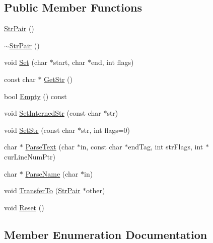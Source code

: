 \subsection*{Public Member Functions}
\begin{DoxyCompactItemize}
\item 
\mbox{\hyperlink{classtinyxml2_1_1_str_pair_a69153963f7052de9f767d3d8c1623a70}{Str\+Pair}} ()
\item 
\mbox{\hyperlink{classtinyxml2_1_1_str_pair_a60bed84d2503296e1c2a73fcef1431f9}{$\sim$\+Str\+Pair}} ()
\item 
void \mbox{\hyperlink{classtinyxml2_1_1_str_pair_a4f05549373394266a1eecba26813c166}{Set}} (char $\ast$start, char $\ast$end, int flags)
\item 
const char $\ast$ \mbox{\hyperlink{classtinyxml2_1_1_str_pair_ad87e3d11330f5e689ba1e7e54c023b57}{Get\+Str}} ()
\item 
bool \mbox{\hyperlink{classtinyxml2_1_1_str_pair_aca963a7eaa900bfddbea7312f040b39c}{Empty}} () const
\item 
void \mbox{\hyperlink{classtinyxml2_1_1_str_pair_a2baf6230e18333e02ab65d0897ee3941}{Set\+Interned\+Str}} (const char $\ast$str)
\item 
void \mbox{\hyperlink{classtinyxml2_1_1_str_pair_a1f82ec6b5bee35ee7466d8565e43b1de}{Set\+Str}} (const char $\ast$str, int flags=0)
\item 
char $\ast$ \mbox{\hyperlink{classtinyxml2_1_1_str_pair_a68e6999b7677fa711287ececb9ba317e}{Parse\+Text}} (char $\ast$in, const char $\ast$end\+Tag, int str\+Flags, int $\ast$cur\+Line\+Num\+Ptr)
\item 
char $\ast$ \mbox{\hyperlink{classtinyxml2_1_1_str_pair_aa6d8998efceba41d87ec2300c70a6085}{Parse\+Name}} (char $\ast$in)
\item 
void \mbox{\hyperlink{classtinyxml2_1_1_str_pair_a35f795b1557fe5fdcbd93d3cc5d6b939}{Transfer\+To}} (\mbox{\hyperlink{classtinyxml2_1_1_str_pair}{Str\+Pair}} $\ast$other)
\item 
void \mbox{\hyperlink{classtinyxml2_1_1_str_pair_a80c1b3bd99bf62ae85c94a29ce537125}{Reset}} ()
\end{DoxyCompactItemize}


\subsection{Member Enumeration Documentation}
\mbox{\label{classtinyxml2_1_1_str_pair_a0301ef962e15dd94574431f1c61266c5}} 

